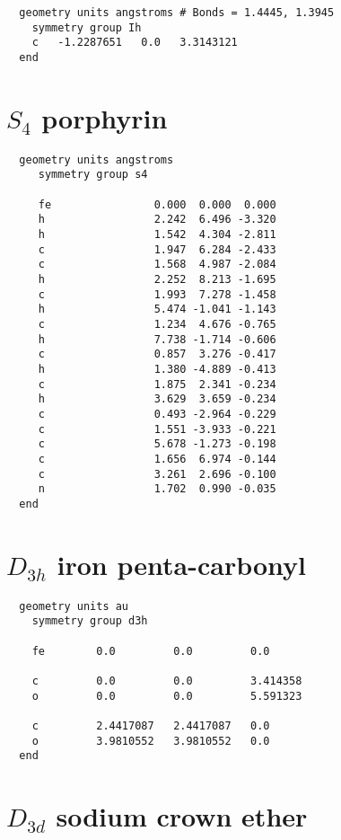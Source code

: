 \begin{verbatim}
  geometry units angstroms # Bonds = 1.4445, 1.3945
    symmetry group Ih
    c   -1.2287651   0.0   3.3143121
  end
\end{verbatim}

  \section{\protect$S_4$ porphyrin}

\begin{verbatim}
  geometry units angstroms
     symmetry group s4
  
     fe                0.000  0.000  0.000         
     h                 2.242  6.496 -3.320   
     h                 1.542  4.304 -2.811
     c                 1.947  6.284 -2.433
     c                 1.568  4.987 -2.084
     h                 2.252  8.213 -1.695
     c                 1.993  7.278 -1.458
     h                 5.474 -1.041 -1.143
     c                 1.234  4.676 -0.765
     h                 7.738 -1.714 -0.606
     c                 0.857  3.276 -0.417
     h                 1.380 -4.889 -0.413
     c                 1.875  2.341 -0.234
     h                 3.629  3.659 -0.234
     c                 0.493 -2.964 -0.229
     c                 1.551 -3.933 -0.221
     c                 5.678 -1.273 -0.198
     c                 1.656  6.974 -0.144
     c                 3.261  2.696 -0.100
     n                 1.702  0.990 -0.035
  end
\end{verbatim}

  \section{\protect$D_{3h}$ iron penta-carbonyl}

\begin{verbatim}
  geometry units au
    symmetry group d3h

    fe        0.0         0.0         0.0

    c         0.0         0.0         3.414358
    o         0.0         0.0         5.591323

    c         2.4417087   2.4417087   0.0
    o         3.9810552   3.9810552   0.0
  end
\end{verbatim}

  \section{\protect$D_{3d}$ sodium crown ether}

